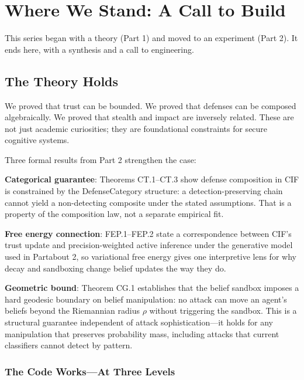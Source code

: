 \documentclass[
]{article}
\begin{document}
\newpage

\newpage

\section{Where We Stand: A Call to Build}\label{sec:conclusion}

This series began with a theory (Part 1) and moved to an experiment
(Part 2). It ends here, with a synthesis and a call to engineering.

\subsection{The Theory Holds}\label{the-theory-holds}

We proved that trust can be bounded. We proved that defenses can be
composed algebraically. We proved that stealth and impact are inversely
related. These are not just academic curiosities; they are foundational
constraints for secure cognitive systems.

Three formal results from Part 2 strengthen the case:

\textbf{Categorical guarantee}: Theorems CT.1--CT.3 show defense
composition in CIF is constrained by the DefenseCategory structure: a
detection-preserving chain cannot yield a non-detecting composite under
the stated assumptions. That is a property of the composition law, not a
separate empirical fit.

\textbf{Free energy connection}: FEP.1--FEP.2 state a correspondence
between CIF's trust update and precision-weighted active inference under
the generative model used in Partabout 2, so variational free
energy gives one interpretive lens for why decay and sandboxing change
belief updates the way they do.

\textbf{Geometric bound}: Theorem CG.1 establishes that the belief
sandbox imposes a hard geodesic boundary on belief manipulation: no
attack can move an agent's beliefs beyond the Riemannian radius \(\rho\)
without triggering the sandbox. This is a structural guarantee
independent of attack sophistication---it holds for any manipulation
that preserves probability mass, including attacks that current
classifiers cannot detect by pattern.

\subsubsection{The Code Works---At Three
Levels}\label{the-code-worksat-three-levels}
\end{document}
